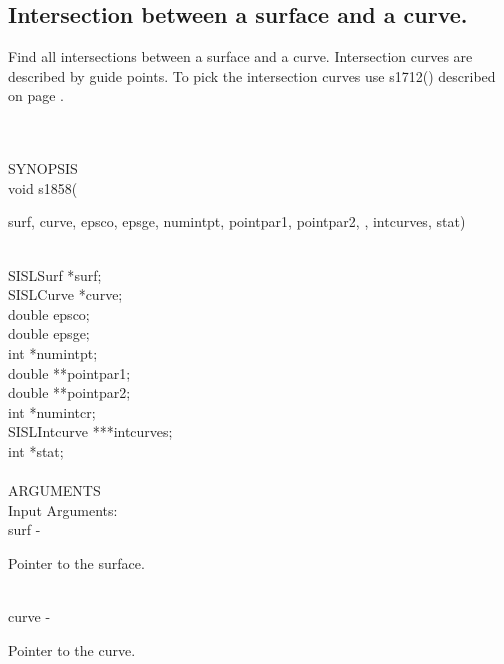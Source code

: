 \subsection{Intersection between a surface and a curve.}
\begin{minipg1}
  Find all intersections between a surface and a curve.
  Intersection curves are described by guide points.
  To pick the intersection curves use s1712() described on page \pageref{s1712}.
\end{minipg1} \\ \\
SYNOPSIS\\
        \>void s1858(\begin{minipg3}
                {\fov surf}, {\fov curve}, {\fov epsco}, {\fov epsge}, {\fov numintpt}, {\fov pointpar1},
                {\fov pointpar2}, ,
                {\fov intcurves}, {\fov stat})
                \end{minipg3}\\[0.3ex]
                \>\>    SISLSurf        \>      *{\fov surf};\\
                \>\>    SISLCurve       \>      *{\fov curve};\\
                \>\>    double  \>      {\fov epsco};\\
                \>\>    double  \>      {\fov epsge};\\
                \>\>    int     \>      *{\fov numintpt};\\
                \>\>    double  \>      **{\fov pointpar1};\\
                \>\>    double  \>      **{\fov pointpar2};\\
                \>\>    int     \>      *{\fov numintcr};\\
                \>\>    SISLIntcurve\>  ***{\fov intcurves};\\
                \>\>    int     \>      *{\fov stat};\\
\\
ARGUMENTS\\
        \>Input Arguments:\\
        \>\>    {\fov surf}\> - \>      \begin{minipg2}
                                Pointer to the surface.
                                \end{minipg2}\\
        \>\>    {\fov curve}\> - \>     \begin{minipg2}
                                Pointer to the curve.
                                \end{minipg2}\\
